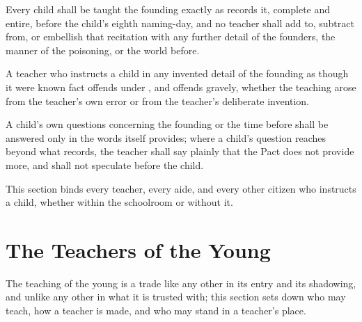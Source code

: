 \begin{clauses}
\item Every child shall be taught the founding exactly as  records it, complete and entire, before the child's eighth naming-day, and no teacher shall add to, subtract from, or embellish that recitation with any further detail of the founders, the manner of the poisoning, or the world before.
\item A teacher who instructs a child in any invented detail of the founding as though it were known fact offends under , and offends gravely, whether the teaching arose from the teacher's own error or from the teacher's deliberate invention.
\item A child's own questions concerning the founding or the time before shall be answered only in the words  itself provides; where a child's question reaches beyond what  records, the teacher shall say plainly that the Pact does not provide more, and shall not speculate before the child.
\item This section binds every teacher, every aide, and every other citizen who instructs a child, whether within the schoolroom or without it.
\end{clauses}

\section{The Teachers of the Young}
\label{sec:schooling:teachers-of-the-young}

The teaching of the young is a trade like any other in its entry and its shadowing, and unlike any other in what it is trusted with; this section sets down who may teach, how a teacher is made, and who may stand in a teacher's place.

